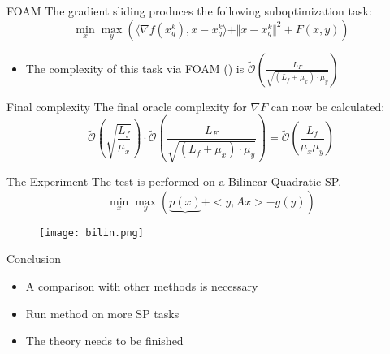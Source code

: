 \documentclass{beamer}
\begin{document}
\begin{frame}{FOAM}
The gradient sliding produces the following suboptimization task:
\[\min\limits_{x }\max\limits_{y} \left(\langle \nabla f(x^k_g), x - x_g^k \rangle +  \Vert x-x^k_g \Vert^2 + F(x, y)\right)\]
\begin{itemize}
    \item The complexity of this task via FOAM (\cite{KovGas2022}) is $\tilde{\mathcal{O}}\left(\frac{L_F}{\sqrt{(L_f + \mu_x)\cdot \mu_y}}\right)$
\end{itemize}
\end{frame}




\begin{frame}{Final complexity}
The final oracle complexity for $\nabla F$ can now be calculated:
\[\tilde{\mathcal{O}}\left( \sqrt{\frac{L_f}{\mu_x}}\right) \cdot \tilde{\mathcal{O}}\left(\frac{L_F}{\sqrt{(L_f + \mu_x)\cdot \mu_y}}\right) = \tilde{\mathcal{O}}\left(\frac{L_f}{\mu_x\mu_y} \right)\]

\end{frame}




\begin{frame}{The Experiment }
The test is performed on a Bilinear Quadratic SP.
\[\min_x \max_y \left(\underbrace{p(x)} + <y, Ax> - g(y)\right)\]


\begin{figure}
\centering
\begin{minipage}{.5\textwidth}
  \centering
  \texttt{[image: bilin.png]}
  \label{fig:test1}
\end{minipage}%
\begin{minipage}{.5\textwidth}
  
\end{minipage}
\end{figure}




\end{frame}


\begin{frame}{Conclusion}
\begin{itemize}
\item A comparison with other methods is necessary

\item Run method on more SP tasks

\item The theory needs to be finished
\end{itemize}



\end{frame}
\end{document}
